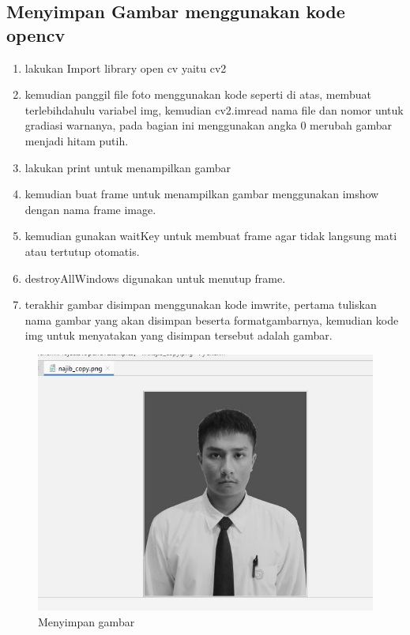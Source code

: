 \subsection{Menyimpan Gambar menggunakan kode opencv}

\begin{enumerate}
	\item lakukan Import library open cv yaitu cv2
	\item kemudian panggil file foto menggunakan kode seperti di atas, membuat terlebihdahulu variabel img, kemudian cv2.imread nama file dan nomor untuk gradiasi warnanya, pada bagian ini menggunakan angka 0 merubah gambar menjadi hitam putih.
	\item lakukan print untuk menampilkan gambar
	\item kemudian buat frame untuk menampilkan gambar menggunakan imshow dengan nama frame image.
	\item kemudian gunakan waitKey untuk membuat frame agar tidak langsung mati atau tertutup otomatis.
	\item destroyAllWindows digunakan untuk menutup frame.
	\item terakhir gambar disimpan menggunakan kode imwrite, pertama tuliskan nama gambar yang akan disimpan beserta formatgambarnya, kemudian kode img untuk menyatakan yang disimpan tersebut adalah gambar.
\end{enumerate}

\newpage
\begin{figure}[ht]
\centering
\includegraphics[scale=0.5]{figures/2,3.jpg}
\caption{Menyimpan gambar}
\label{contoh}
\end{figure}

